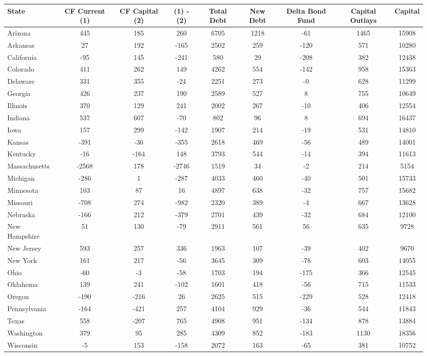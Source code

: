 \begin{tabularx}{\linewidth}{@{}lCCCCCCCC@{}}

\toprule
{State}&{CF Current (1)}&{CF Capital (2)}&{(1) - (2)}&{Total Debt}&{New Debt}&{Delta Bond Fund}&{Capital Outlays}&{Capital} \tabularnewline
\midrule \addlinespace[\belowrulesep]
Arizona&445&185&260&6705&1218&-61&1465&15908 \tabularnewline
Arkansas&27&192&-165&2502&259&-120&571&10280 \tabularnewline
California&-95&145&-241&580&29&-208&382&12438 \tabularnewline
Colorado&411&262&149&4262&554&-142&958&15363 \tabularnewline
Delaware&331&355&-24&2251&273&-0&628&11299 \tabularnewline
Georgia&426&237&190&2589&527&8&755&10649 \tabularnewline
Illinois&370&129&241&2002&267&-10&406&12554 \tabularnewline
Indiana&537&607&-70&802&96&8&694&16437 \tabularnewline
Iowa&157&299&-142&1907&214&-19&531&14810 \tabularnewline
Kansas&-391&-36&-355&2618&469&-56&489&14001 \tabularnewline
Kentucky&-16&-164&148&3793&544&-14&394&11613 \tabularnewline
Massachusetts&-2568&178&-2746&1519&34&-2&214&5154 \tabularnewline
Michigan&-286&1&-287&4033&460&-40&501&15733 \tabularnewline
Minnesota&103&87&16&4897&638&-32&757&15682 \tabularnewline
Missouri&-708&274&-982&2320&389&-4&667&13628 \tabularnewline
Nebraska&-166&212&-379&2701&439&-32&684&12100 \tabularnewline
New Hampshire&51&130&-79&2911&561&56&635&9728 \tabularnewline
New Jersey&593&257&336&1963&107&-39&402&9670 \tabularnewline
New York&161&217&-56&3645&309&-78&603&14055 \tabularnewline
Ohio&-60&-3&-58&1703&194&-175&366&12545 \tabularnewline
Oklahoma&139&241&-102&1601&418&-56&715&11533 \tabularnewline
Oregon&-190&-216&26&2625&515&-229&528&12418 \tabularnewline
Pennsylvania&-164&-421&257&4104&929&-36&544&11843 \tabularnewline
Texas&558&-207&765&4908&951&-134&878&13884 \tabularnewline
Washington&379&95&285&4309&852&-183&1130&18356 \tabularnewline
Wisconsin&-5&153&-158&2072&163&-65&381&10752 \tabularnewline
\bottomrule 

\end{tabularx}

